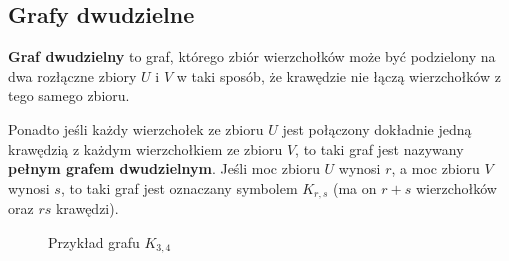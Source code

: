 \subsection*{Grafy dwudzielne}

\textbf{Graf dwudzielny} to graf, którego zbiór wierzchołków może być podzielony na dwa rozłączne zbiory $U$ i $V$ w taki sposób, że krawędzie nie łączą wierzchołków z tego samego zbioru. 

Ponadto jeśli każdy wierzchołek ze zbioru $U$ jest połączony dokładnie jedną krawędzią z każdym wierzchołkiem ze zbioru $V$, to taki graf jest nazywany \textbf{pełnym grafem dwudzielnym}. Jeśli moc zbioru $U$ wynosi $r$, a moc zbioru $V$ wynosi $s$, to taki graf jest oznaczany symbolem $K_{r,s}$ (ma on $r+s$ wierzchołków oraz $rs$ krawędzi).

\begin{figure}[h]
\centering
{}
\captionsetup{justification=centering}
\caption{Przykład grafu $K_{3,4}$} \label{fig:k-3-4-graph-example}
\end{figure}
